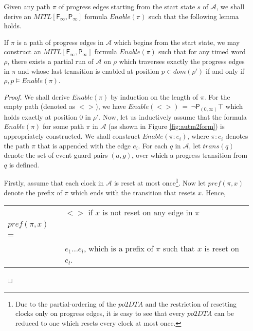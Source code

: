 \documentclass{llncs}
\newcommand{\fut}{\textsf{F}}
\newcommand{\past}{\textsf{P}}
\newcommand{\potdta}{\mbox{$\mathit{po2DTA}$}}
\newcommand{\autm}{\mathcal A}
\newcommand{\mitlfpinf}{\mbox{$\mathit{MITL[\fut_\infty,\past_\infty]}$}}
\begin{document}
Given any path $\pi$ of progress edges starting from the start state $s$ of $\autm$, we shall derive an \mitlfpinf\/ formula $\mathit{Enable}(\pi)$ such that the following lemma holds.

\begin{lemma}
If $\pi$ is a path of progress edges in $\autm$ which begins from the start state, we may construct an \mitlfpinf\/ formula $\mathit{Enable}(\pi)$ such that for any timed word $\rho$, there exists a partial run of $\autm$ on $\rho$ which traverses exactly the progress edges in $\pi$ and whose last transition is enabled at position $p\in dom(\rho')$ if and only if $\rho,p\models \mathit{Enable}(\pi)$.
\end{lemma}
\begin{proof}
We shall derive $\mathit{Enable}(\pi)$ by induction on the length of $\pi$. For the empty path (denoted as $<>$), we have $\mathit{Enable}(<>) ~=~ \neg\past_{(0,\infty)}\top$ which holds exactly at position 0 in $\rho'$. Now, let us inductively assume that the formula $\mathit{Enable}(\pi)$ for some path $\pi$ in $\autm$ (as shown in Figure \ref{fig:autm2form}) is appropriately constructed. We shall construct $\mathit{Enable}(\pi:e_i)$, where $\pi:e_i$ denotes the path $\pi$ that is appended with the edge $e_i$.   For each  $q$ in $\autm$, let $trans(q)$ denote the set of event-guard pairs $(a,g)$, over which a progress transition from $q$ is defined. 

Firstly, assume that each clock in $\autm$ is reset at most once\footnote{Due to the partial-ordering of the \potdta\/ and the restriction of resetting clocks only on progress edges, it is easy to see that every \potdta\/ can be reduced to one which resets every clock at most once.}. Now let $pref(\pi,x)$ denote the prefix of $\pi$ which ends with the transition that resets $x$. Hence,\\
\begin{tabular}{l|l}
&$<>$ if $x$ is not reset on any edge in $\pi$\\
$pref(\pi,x)$ =&\\
&$e_1...e_l$, which is a prefix of $\pi$ such that $x$ is reset on $e_l$.\\
\end{tabular}


\end{proof}
\end{document}
